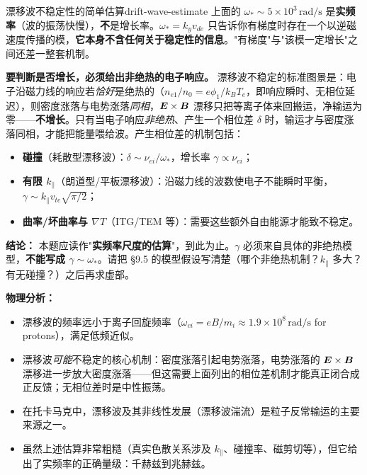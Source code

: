 \begin{example}{漂移波不稳定性的简单估算}{drift-wave-estimate}
上面的 $\omega_*\sim5\times10^{3}\,\mathrm{rad/s}$ 是\textbf{实频率}（波的振荡快慢），\textbf{不}是增长率。$\omega_*=k_yv_{de}$ 只告诉你有梯度时存在一个以逆磁速度传播的模，\textbf{它本身不含任何关于稳定性的信息}。"有梯度"与"该模一定增长"之间还差一整套机制。

\textbf{要判断是否增长，必须给出非绝热的电子响应。} 漂移波不稳定的标准图景是：电子沿磁力线的响应若\emph{恰好}是绝热的（$n_{e1}/n_0=e\phi_1/k_BT_e$，即响应瞬时、无相位延迟），则密度涨落与电势涨落\emph{同相}，$\bm{E}\times\bm{B}$ 漂移只把等离子体来回搬运，净输运为零——\textbf{不增长}。只有当电子响应\emph{非绝热}、产生一个相位差 $\delta$ 时，输运才与密度涨落同相，才能把能量喂给波。产生相位差的机制包括：
\begin{itemize}[leftmargin=*,itemsep=0pt]
\item \textbf{碰撞}（耗散型漂移波）：$\delta\sim\nu_{ei}/\omega_*$，增长率 $\gamma\propto\nu_{ei}$；
\item \textbf{有限 $k_\parallel$}（朗道型/平板漂移波）：沿磁力线的波数使电子不能瞬时平衡，$\gamma\sim k_\parallel v_{te}\sqrt{\pi/2}$；
\item \textbf{曲率/坏曲率与 $\nabla T$}（ITG/TEM 等）：需要这些额外自由能源才能致不稳定。
\end{itemize}

\textbf{结论：} 本题应读作"\textbf{实频率尺度的估算}"，到此为止。$\gamma$ 必须来自具体的非绝热模型，\textbf{不能写成 $\gamma\sim\omega_*$}。请把 \S9.5 的模型假设写清楚（哪个非绝热机制？$k_\parallel$ 多大？有无碰撞？）之后再求虚部。

\textbf{物理分析：}
\begin{itemize}[leftmargin=*,itemsep=0pt]
\item 漂移波的频率远小于离子回旋频率（$\omega_{ci} = eB/m_i \approx 1.9\times 10^{8}\,\mathrm{rad/s}$ for protons），满足低频近似。
\item 漂移波\emph{可能}不稳定的核心机制：密度涨落引起电势涨落，电势涨落的 $\bm{E}\times\bm{B}$ 漂移进一步放大密度涨落——但这需要上面列出的相位差机制才能真正闭合成正反馈；无相位差时是中性振荡。
\item 在托卡马克中，漂移波及其非线性发展（漂移波湍流）是粒子反常输运的主要来源之一。
\item 虽然上述估算非常粗糙（真实色散关系涉及 $k_{\parallel}$、碰撞率、磁剪切等），但它给出了实频率的正确量级：千赫兹到兆赫兹。
\end{itemize}
\end{example}

